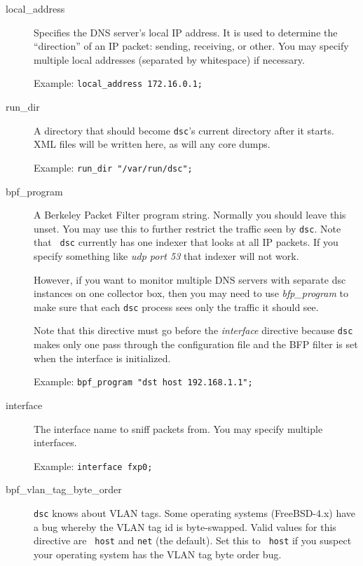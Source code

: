 \documentclass{report}
\def\dsc{{\sc dsc}}
\begin{document}
\begin{description}

\item[local\_address]

	Specifies the DNS server's local IP address.  It is used
	to determine the ``direction'' of an IP packet: sending,
	receiving, or other.  You may specify multiple local addresses
	(separated by whitespace) if necessary.

	Example: {\tt local\_address 172.16.0.1;\/}

\item[run\_dir]

	A directory that should become {\tt dsc\/}'s current directory
	after it starts.  XML files will be written here, as will
	any core dumps.

	Example: {\tt run\_dir "/var/run/dsc";\/}

\item[bpf\_program]

	A Berkeley Packet Filter program string.  Normally you
	should leave this unset.  You may use this to further
	restrict the traffic seen by {\tt dsc\/}.  Note that {\tt
	dsc\/} currently has one indexer that looks at all IP
	packets.  If you specify something like {\em udp port 53\/}
	that indexer will not work.

	However, if you want to monitor multiple DNS servers with
	separate {\dsc} instances on one collector box, then you
	may need to use {\em bfp\_program} to make sure that each
	{\tt dsc} process sees only the traffic it should see.

	Note that this directive must go before the {\em interface\/}
	directive because {\tt dsc\/} makes only one pass through
	the configuration file and the BFP filter is set when the
	interface is initialized.

	Example: {\tt bpf\_program "dst host 192.168.1.1";\/}

\item[interface]

	The interface name to sniff packets from.   You may specify multiple
	interfaces.

	Example: {\tt interface fxp0;\/}

\item[bpf\_vlan\_tag\_byte\_order]

	{\tt dsc\/} knows about VLAN tags.  Some operating systems
	(FreeBSD-4.x) have a bug whereby the VLAN tag id is
	byte-swapped.  Valid values for this directive are {\tt
	host\/} and {\tt net\/} (the default).    Set this to {\tt
	host\/} if you suspect your operating system has the VLAN
	tag byte order bug.


\end{description}
\end{document}
